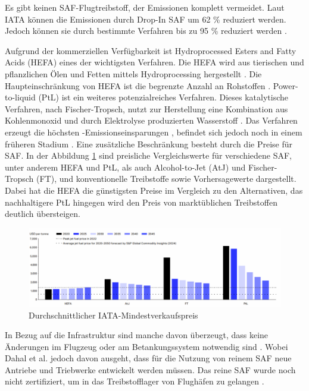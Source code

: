 Es gibt keinen SAF-Flugtreibstoff, der Emissionen komplett vermeidet. 
Laut IATA können die Emissionen durch Drop-In SAF um 62 \% reduziert werden.
Jedoch können sie durch bestimmte Verfahren bis zu 95 \% reduziert werden \cite{icao_saf_conversion_2024}.


 
Aufgrund der kommerziellen Verfügbarkeit ist Hydroprocessed Esters and Fatty Acids (HEFA) eines der wichtigsten Verfahren.
Die HEFA wird aus tierischen und pflanzlichen Ölen und Fetten mittels Hydroprocessing hergestellt \cite{bauen2020sustainable}. 
Die Haupteinschränkung von HEFA ist die begrenzte Anzahl an Rohstoffen \cite{bauen2020sustainable}.
Power-to-liquid (PtL) ist ein weiteres potenzialreiches Verfahren.
Dieses katalytische Verfahren, nach Fischer-Tropsch, nutzt zur Herstellung eine Kombination aus 
Kohlenmonoxid  und durch Elektrolyse produzierten Wasserstoff  \cite{bauen2020sustainable}.
Das Verfahren erzeugt die höchsten -Emissionseinsparungen \cite{de2017life}, 
befindet sich jedoch noch in einem früheren Stadium \cite{bauen2020sustainable}.
Eine zusätzliche Beschränkung besteht durch die Preise für SAF. 
In der Abbildung \ref{safpreis} sind preisliche Vergleichswerte für verschiedene SAF, unter anderem HEFA und PtL, als auch
Alcohol-to-Jet (AtJ) und Fischer-Tropsch (FT),
und konventionelle Treibstoffe sowie Vorhersagewerte dargestellt.
Dabei hat die HEFA die günstigsten Preise im Vergleich zu den Alternativen, 
das nachhaltigere PtL hingegen wird den Preis von marktüblichen Treibstoffen deutlich übersteigen.

\begin{figure}[h]
	\centering
	\includegraphics[width=0.8\linewidth]{Bilder/Preise SAF.png}
	\caption[Durchschnittlicher IATA-Mindestverkaufspreis (MSP) der wichtigsten SAF-Pfade über den Zeitraum 2020 bis 2050]{Durchschnittlicher IATA-Mindestverkaufspreis \cite{icao_saf_conversion_2024}}
	\label{safpreis}
\end{figure}
In Bezug auf die Infrastruktur sind manche davon überzeugt, dass keine Änderungen im Flugzeug oder am Betankungssystem notwendig sind \cite{sky2020hydrogen}. %
Wobei Dahal et al. \cite{dahal2021techno} jedoch davon ausgeht, dass für die Nutzung von reinem SAF neue Antriebe und Triebwerke entwickelt werden müssen.
Das reine SAF wurde noch nicht zertifiziert, um in das Treibstofflager von Flughäfen zu gelangen \cite{iata_saf_2024}.


